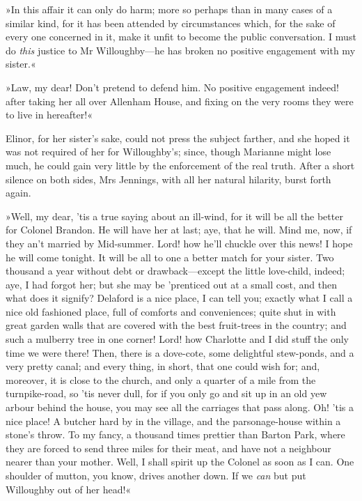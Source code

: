 »In this affair it can only do harm; more so perhaps than in many cases of a similar kind, for it has been attended by circumstances which, for the sake of every one concerned in it, make it unfit to become the public conversation. I must do \textit{this} justice to Mr Willoughby—he has broken no positive engagement with my sister.«

»Law, my dear! Don’t pretend to defend him. No positive engagement indeed! after taking her all over Allenham House, and fixing on the very rooms they were to live in hereafter!«

Elinor, for her sister’s sake, could not press the subject farther, and she hoped it was not required of her for Willoughby’s; since, though Marianne might lose much, he could gain very little by the enforcement of the real truth. After a short silence on both sides, Mrs Jennings, with all her natural hilarity, burst forth again.

»Well, my dear, ’tis a true saying about an ill-wind, for it will be all the better for Colonel Brandon. He will have her at last; aye, that he will. Mind me, now, if they an’t married by Mid-summer. Lord! how he’ll chuckle over this news! I hope he will come tonight. It will be all to one a better match for your sister. Two thousand a year without debt or drawback—except the little love-child, indeed; aye, I had forgot her; but she may be ’prenticed out at a small cost, and then what does it signify? Delaford is a nice place, I can tell you; exactly what I call a nice old fashioned place, full of comforts and conveniences; quite shut in with great garden walls that are covered with the best fruit-trees in the country; and such a mulberry tree in one corner! Lord! how Charlotte and I did stuff the only time we were there! Then, there is a dove-cote, some delightful stew-ponds, and a very pretty canal; and every thing, in short, that one could wish for; and, moreover, it is close to the church, and only a quarter of a mile from the turnpike-road, so ’tis never dull, for if you only go and sit up in an old yew arbour behind the house, you may see all the carriages that pass along. Oh! ’tis a nice place! A butcher hard by in the village, and the parsonage-house within a stone’s throw. To my fancy, a thousand times prettier than Barton Park, where they are forced to send three miles for their meat, and have not a neighbour nearer than your mother. Well, I shall spirit up the Colonel as soon as I can. One shoulder of mutton, you know, drives another down. If we \textit{can} but put Willoughby out of her head!«

